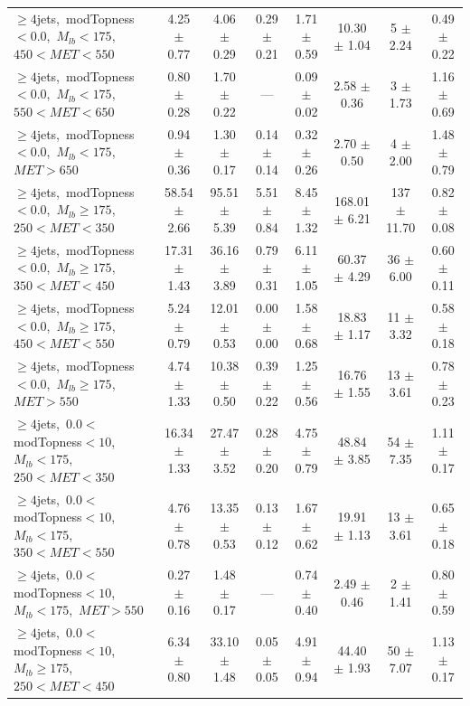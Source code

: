 \begin{table}
\begin{tabular}{|l|c c c c c|c|c|}
$\ge4$jets,~modTopness$<0.0$,~$M_{lb}<175$,~$450<MET<550$  & 4.25 $\pm$ 0.77  & 4.06 $\pm$ 0.29  & 0.29 $\pm$ 0.21  & 1.71 $\pm$ 0.59  & 10.30 $\pm$ 1.04  & 5 $\pm$ 2.24  & 0.49 $\pm$ 0.22 \\*
$\ge4$jets,~modTopness$<0.0$,~$M_{lb}<175$,~$550<MET<650$  & 0.80 $\pm$ 0.28  & 1.70 $\pm$ 0.22  & ---  & 0.09 $\pm$ 0.02  & 2.58 $\pm$ 0.36  & 3 $\pm$ 1.73  & 1.16 $\pm$ 0.69 \\*
$\ge4$jets,~modTopness$<0.0$,~$M_{lb}<175$,~$MET>650$  & 0.94 $\pm$ 0.36  & 1.30 $\pm$ 0.17  & 0.14 $\pm$ 0.14  & 0.32 $\pm$ 0.26  & 2.70 $\pm$ 0.50  & 4 $\pm$ 2.00  & 1.48 $\pm$ 0.79 \\*
\hline
$\ge4$jets,~modTopness$<0.0$,~$M_{lb}\ge175$,~$250<MET<350$  & 58.54 $\pm$ 2.66  & 95.51 $\pm$ 5.39  & 5.51 $\pm$ 0.84  & 8.45 $\pm$ 1.32  & 168.01 $\pm$ 6.21  & 137 $\pm$ 11.70  & 0.82 $\pm$ 0.08 \\*
$\ge4$jets,~modTopness$<0.0$,~$M_{lb}\ge175$,~$350<MET<450$  & 17.31 $\pm$ 1.43  & 36.16 $\pm$ 3.89  & 0.79 $\pm$ 0.31  & 6.11 $\pm$ 1.05  & 60.37 $\pm$ 4.29  & 36 $\pm$ 6.00  & 0.60 $\pm$ 0.11 \\*
$\ge4$jets,~modTopness$<0.0$,~$M_{lb}\ge175$,~$450<MET<550$  & 5.24 $\pm$ 0.79  & 12.01 $\pm$ 0.53  & 0.00 $\pm$ 0.00  & 1.58 $\pm$ 0.68  & 18.83 $\pm$ 1.17  & 11 $\pm$ 3.32  & 0.58 $\pm$ 0.18 \\*
$\ge4$jets,~modTopness$<0.0$,~$M_{lb}\ge175$,~$MET>550$  & 4.74 $\pm$ 1.33  & 10.38 $\pm$ 0.50  & 0.39 $\pm$ 0.22  & 1.25 $\pm$ 0.56  & 16.76 $\pm$ 1.55  & 13 $\pm$ 3.61  & 0.78 $\pm$ 0.23 \\*
\hline
$\ge4$jets,~$0.0<$modTopness$<10$,~$M_{lb}<175$,~$250<MET<350$  & 16.34 $\pm$ 1.33  & 27.47 $\pm$ 3.52  & 0.28 $\pm$ 0.20  & 4.75 $\pm$ 0.79  & 48.84 $\pm$ 3.85  & 54 $\pm$ 7.35  & 1.11 $\pm$ 0.17 \\*
$\ge4$jets,~$0.0<$modTopness$<10$,~$M_{lb}<175$,~$350<MET<550$  & 4.76 $\pm$ 0.78  & 13.35 $\pm$ 0.53  & 0.13 $\pm$ 0.12  & 1.67 $\pm$ 0.62  & 19.91 $\pm$ 1.13  & 13 $\pm$ 3.61  & 0.65 $\pm$ 0.18 \\*
$\ge4$jets,~$0.0<$modTopness$<10$,~$M_{lb}<175$,~$MET>550$  & 0.27 $\pm$ 0.16  & 1.48 $\pm$ 0.17  & ---  & 0.74 $\pm$ 0.40  & 2.49 $\pm$ 0.46  & 2 $\pm$ 1.41  & 0.80 $\pm$ 0.59 \\*
\hline
$\ge4$jets,~$0.0<$modTopness$<10$,~$M_{lb}\ge175$,~$250<MET<450$  & 6.34 $\pm$ 0.80  & 33.10 $\pm$ 1.48  & 0.05 $\pm$ 0.05  & 4.91 $\pm$ 0.94  & 44.40 $\pm$ 1.93  & 50 $\pm$ 7.07  & 1.13 $\pm$ 0.17 \\*

\end{tabular}
\end{table}
